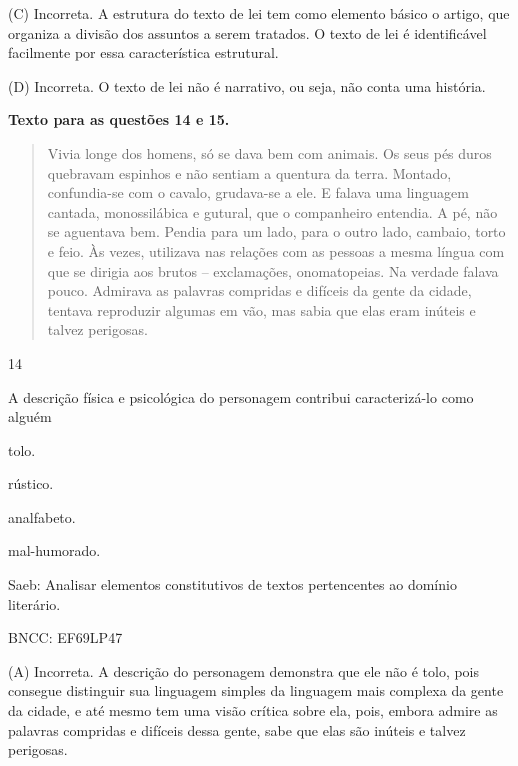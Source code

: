 (C) Incorreta. A estrutura do texto de lei tem como elemento básico o
artigo, que organiza a divisão dos assuntos a serem tratados. O texto de
lei é identificável facilmente por essa característica estrutural.

(D) Incorreta. O texto de lei não é narrativo, ou seja, não conta uma
história.

\textbf{Texto para as questões 14 e 15.}

\begin{quote}
Vivia longe dos homens, só se dava bem com animais. Os seus pés duros
quebravam espinhos e não sentiam a quentura da terra. Montado,
confundia-se com o cavalo, grudava-se a ele. E falava uma linguagem
cantada, monossilábica e gutural, que o companheiro entendia. A pé, não
se aguentava bem. Pendia para um lado, para o outro lado, cambaio, torto
e feio. Às vezes, utilizava nas relações com as pessoas a mesma língua
com que se dirigia aos brutos -- exclamações, onomatopeias. Na verdade
falava pouco. Admirava as palavras compridas e difíceis da gente da
cidade, tentava reproduzir algumas em vão, mas sabia que elas eram
inúteis e talvez perigosas.
\end{quote}


\num{14}

A descrição física e psicológica do personagem contribui caracterizá-lo
como alguém

\begin{escolha}
\item tolo.

\item rústico.

\item analfabeto.

\item mal-humorado.
\end{escolha}

Saeb: Analisar elementos constitutivos de textos pertencentes ao domínio
literário.

BNCC: EF69LP47

(A) Incorreta. A descrição do personagem demonstra que ele não é tolo,
pois consegue distinguir sua linguagem simples da linguagem mais
complexa da gente da cidade, e até mesmo tem uma visão crítica sobre
ela, pois, embora admire as palavras compridas e difíceis dessa gente,
sabe que elas são inúteis e talvez perigosas.

